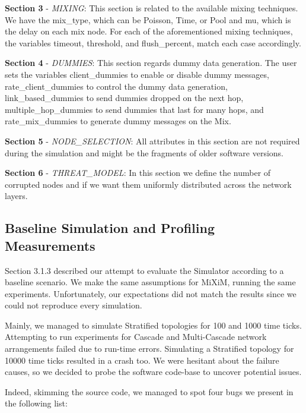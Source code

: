 \documentclass[logo,msc,cyber]{infthesis}   %
\begin{document}
\textbf{Section 3} - \emph{MIXING}: This section is related to the
available mixing techniques. We have the mix\_type, which can be Poisson,
Time, or Pool and mu, which is the delay on each mix node. For each of the
aforementioned mixing techniques, the variables timeout, threshold, and
flush\_percent, match each case accordingly.

\textbf{Section 4} - \emph{DUMMIES}: This section regards dummy data
generation. The user sets the variables client\_dummies to enable or
disable dummy messages, rate\_client\_dummies to control the dummy data
generation, link\_based\_dummies to send dummies dropped on the next hop,
multiple\_hop\_dummies to send dummies that last for many hops, and
rate\_mix\_dummies to generate dummy messages on the Mix.

\textbf{Section 5} - \emph{NODE\_SELECTION}: All attributes in this
section are not required during the simulation and might be the fragments of
older software versions. 

\textbf{Section 6} - \emph{THREAT\_MODEL}: In this section we define the number
of corrupted nodes and if we want them uniformly distributed across the network
layers.


\subsection{Baseline Simulation and Profiling Measurements}

Section 3.1.3 described our attempt to evaluate the Simulator according to a
baseline scenario. We make the same assumptions for MiXiM, running the same
experiments. Unfortunately, our expectations did not match the results since we
could not reproduce every simulation.

Mainly, we managed to simulate Stratified topologies for 100 and 1000 time
ticks. Attempting to run experiments for Cascade and Multi-Cascade network
arrangements failed due to run-time errors. Simulating a Stratified topology for
10000 time ticks resulted in a crash too. We were hesitant about the failure
causes, so we decided to probe the software code-base to uncover potential
issues.

Indeed, skimming the source code, we managed to spot four bugs we present in the following list: 
\end{document}
